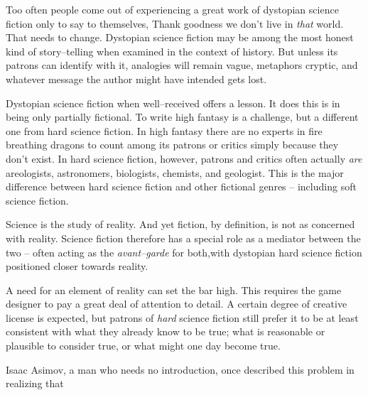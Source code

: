 

Too often people come out of experiencing a great work of dystopian science fiction only to say to themselves, Thank goodness we don't live in {\it that} world. That needs to change. Dystopian science fiction may be among the most honest kind of story--telling when examined in the context of history. But unless its patrons can identify with it, analogies will remain vague, metaphors cryptic, and whatever message the author might have intended gets lost.

    {}

Dystopian science fiction when well--received offers a lesson. It does this is in being only partially fictional. To write high fantasy is a challenge, but a different one from hard science fiction. In high fantasy there are no experts in fire breathing dragons to count among its patrons or critics simply because they don't exist. In hard science fiction, however, patrons and critics often actually {\it are} areologists, astronomers, biologists, chemists, and geologist. This is the major difference between hard science fiction and other fictional genres -- including soft science fiction.

Science is the study of reality. And yet fiction, by definition, is not as concerned with reality. Science fiction therefore has a special role as a mediator between the two -- often acting as the {\it avant--garde} for both,\footnotecite[shedroff2012] with dystopian hard science fiction positioned closer towards reality.

A need for an element of reality can set the bar high. This requires the game designer to pay a great deal of attention to detail. A certain degree of creative license is expected, but patrons of {\it hard} science fiction still prefer it to be at least consistent with what they already know to be true; what is reasonable or plausible to consider true, or what might one day become true.

Isaac Asimov, a man who needs no introduction, once described this problem in realizing that \footnotecite[extras={, p.~73.}][asimov1981]

